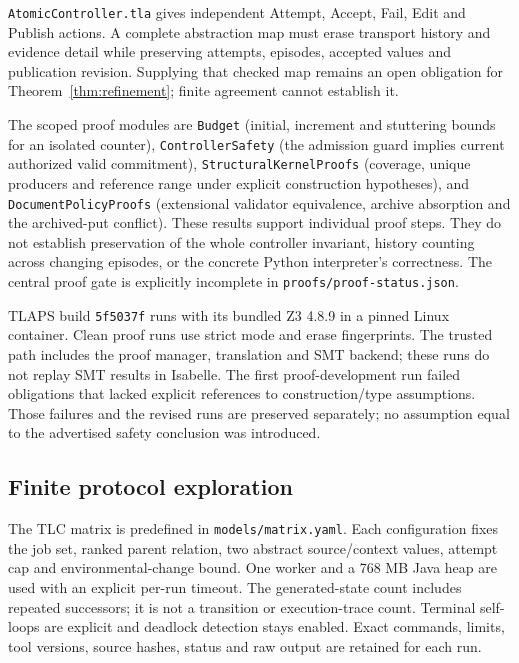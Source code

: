 \documentclass[pdflatex,sn-mathphys-num]{sn-jnl}
\theoremstyle{thmstyleone}
\theoremstyle{thmstylethree}
\theoremstyle{thmstyletwo}
\begin{document}
\texttt{AtomicController.tla} gives independent Attempt, Accept, Fail, Edit and Publish actions. A complete abstraction map must erase transport history and evidence detail while preserving attempts, episodes, accepted values and publication revision. Supplying that checked map remains an open obligation for Theorem~\ref{thm:refinement}; finite agreement cannot establish it.

The scoped proof modules are \texttt{Budget} (initial, increment and stuttering bounds for an isolated counter), \texttt{ControllerSafety} (the admission guard implies current authorized valid commitment), \texttt{StructuralKernelProofs} (coverage, unique producers and reference range under explicit construction hypotheses), and \texttt{DocumentPolicyProofs} (extensional validator equivalence, archive absorption and the archived-put conflict). These results support individual proof steps. They do not establish preservation of the whole controller invariant, history counting across changing episodes, or the concrete Python interpreter's correctness. The central proof gate is explicitly incomplete in \texttt{proofs/proof-status.json}.

TLAPS build \texttt{5f5037f} runs with its bundled Z3 4.8.9 in a pinned Linux container. Clean proof runs use strict mode and erase fingerprints. The trusted path includes the proof manager, translation and SMT backend; these runs do not replay SMT results in Isabelle. The first proof-development run failed obligations that lacked explicit references to construction/type assumptions. Those failures and the revised runs are preserved separately; no assumption equal to the advertised safety conclusion was introduced.

\subsection{Finite protocol exploration}
The TLC matrix is predefined in \texttt{models/matrix.yaml}. Each configuration fixes the job set, ranked parent relation, two abstract source/context values, attempt cap and environmental-change bound. One worker and a 768 MB Java heap are used with an explicit per-run timeout. The generated-state count includes repeated successors; it is not a transition or execution-trace count. Terminal self-loops are explicit and deadlock detection stays enabled. Exact commands, limits, tool versions, source hashes, status and raw output are retained for each run.
\end{document}
